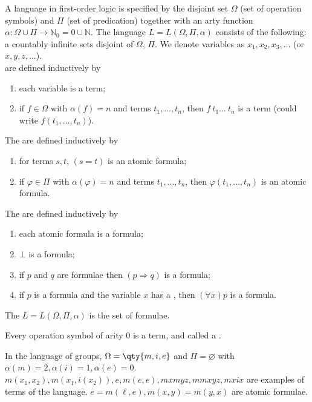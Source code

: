 A language in first-order logic is specified by the disjoint set $\Omega$ (set of operation symbols) and $\Pi$ (set of predication) together with an arty function \( \alpha \colon \Omega \cup \Pi \to \mathbb N_0 = \qty{0} \cup \mathbb{N} \).
The language $L = L(\Omega, \Pi, \alpha)$ consists of the following:
 a countably infinite sets disjoint of $\Omega$, $\Pi$.
We denote variables as $x_1, x_2, x_3, \dots$ (or $x, y, z, \dots$). \\
 are defined inductively by
\begin{enumerate}
    \item each variable is a term;
    \item if \( f \in \Omega \) with \( \alpha(f) = n \) and terms \( t_1, \dots, t_n \), then \( f\ t_1\dots\ t_n \) is a term (could write $f(t_1, \dots, t_n)$).
\end{enumerate}
The  are defined inductively by
\begin{enumerate}
    \item for terms \( s, t \), \( (s = t) \) is an atomic formula;
    \item if \( \varphi \in \Pi \) with \( \alpha(\varphi) = n \) and terms \( t_1, \dots, t_n \), then \( \varphi(t_1, \dots, t_n) \) is an atomic formula.
\end{enumerate}
The  are defined inductively by
\begin{enumerate}
    \item each atomic formula is a formula;
    \item \( \bot \) is a formula;
    \item if \( p \) and \( q \) are formulae then \( (p \Rightarrow q) \) is a formula;
    \item if \( p \) is a formula and the variable \( x \) has a , then \( (\forall x) p \) is a formula.
\end{enumerate}

The  \( L = L(\Omega, \Pi, \alpha) \) is the set of formulae.

\begin{definition}[Constant]
    Every operation symbol of arity $0$ is a term, and called a .
\end{definition}

\begin{example}
    In the language of groups, \( \Omega = \qty{m, i, e} \) and \( \Pi = \varnothing \) with \( \alpha(m) = 2, \alpha(i) = 1, \alpha(e) = 0 \).
    \( m(x_1, x_2), m(x_1, i(x_2)), e, m(e, e), mxmyz, mmxyz, mxix \) are examples of terms of the language.
    \( e = m(\ell, e), m(x,y) = m(y,x) \) are atomic formulae.
\end{example}

